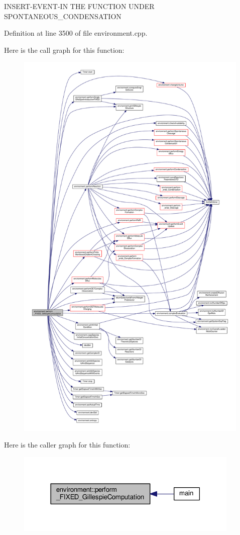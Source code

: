 I\-N\-S\-E\-R\-T-\/\-E\-V\-E\-N\-T-\/\-I\-N T\-H\-E F\-U\-N\-C\-T\-I\-O\-N U\-N\-D\-E\-R S\-P\-O\-N\-T\-A\-N\-E\-O\-U\-S\-\_\-\-C\-O\-N\-D\-E\-N\-S\-A\-T\-I\-O\-N 

Definition at line 3500 of file environment.\-cpp.



Here is the call graph for this function\-:\nopagebreak
\begin{figure}[H]
\begin{center}
\leavevmode
\includegraphics[height=550pt]{a00011_a847f333ec6acea11f2d0fc99bab52586_cgraph}
\end{center}
\end{figure}




Here is the caller graph for this function\-:\nopagebreak
\begin{figure}[H]
\begin{center}
\leavevmode
\includegraphics[width=302pt]{a00011_a847f333ec6acea11f2d0fc99bab52586_icgraph}
\end{center}
\end{figure}


